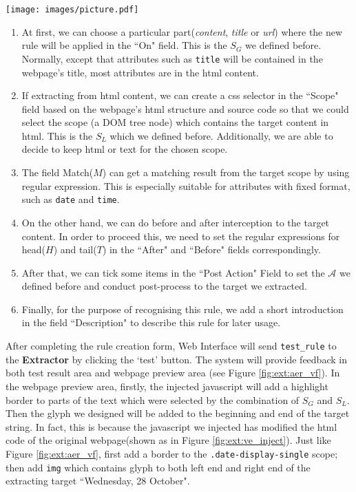 \noindent\begin{minipage}{0.5\textwidth}
\texttt{[image: images/picture.pdf]}
\end{minipage}
\hfill
\begin{minipage}{0.5\textwidth}
\begin{enumerate}
	\item At first, we can choose a particular part(\textit{content}, \textit{title} or \textit{url}) where the new rule will be applied in the ``On" field. This is the $S_G$ we defined before. Normally, except that attributes such as \texttt{title} will be contained in the webpage's title, most attributes are in the html content.
	\item If extracting from html content, we can create a css selector in the ``Scope" field based on the webpage's html structure and source code so that we could select the scope (a DOM tree node) which contains the target content in html. This is the $S_L$ which we defined before. Additionally, we are able to decide to keep html or text for the chosen scope.
\end{enumerate}
\end{minipage}

\begin{enumerate}
\setcounter{enumi}{2}
	\item The field Match($M$) can get a matching result from the target scope by using regular expression. This is especially suitable for attributes with fixed format, such as \texttt{date} and \texttt{time}.
	\item On the other hand, we can do before and after interception to the target content. In order to proceed this, we need to set the regular expressions for head($H$) and tail($T$) in the ``After" and ``Before" fields correspondingly.
	\item After that, we can tick some items in the ``Post Action" Field to set the $\mathcal{A}$ we defined before and conduct post-process to the target we extracted.
	\item Finally, for the purpose of recognising this rule, we add a short introduction in the field ``Description" to describe this rule for later usage.
\end{enumerate}

After completing the rule creation form, Web Interface will send \texttt{test\_rule} to the \textbf{Extractor} by clicking the `test' button. The system will provide feedback in both test result area and webpage preview area (see Figure \ref{fig:ext:aer_vf}). In the webpage preview area, firstly, the injected javascript will add a highlight border to parts of the text which were selected by the combination of $S_G$ and $S_L$. Then the glyph we designed will be added to the beginning and end of the target string. In fact, this is because the javascript we injected has modified the html code of the original webpage(shown as in Figure \ref{fig:ext:ve_inject}). Just like Figure \ref{fig:ext:aer_vf}, first add a border to the \texttt{.date-display-single} scope; then add \texttt{img} which contains glyph to both left end and right end of the extracting target ``Wednesday, 28 October".

